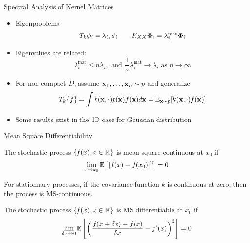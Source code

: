 \documentclass{beamer}
\begin{document}
\begin{frame}{Spectral Analysis of Kernel Matrices}
\begin{itemize}
    \item Eigenproblems
    \begin{equation*}
        T_k \phi_i = \lambda_i, \phi_i \qquad K_{XX} \boldsymbol{\mathbf{\Phi}}_i = \lambda_i^\text{mat} \boldsymbol{\mathbf{\Phi}}_i
    \end{equation*}
    \item Eigenvalues are related: 
    \begin{equation*}
        \lambda_i^\text{mat} \le n \lambda_i,  \text{ and }  \frac 1 n \lambda_i^\text{mat} \rightarrow \lambda_i \text{ as } n\to\infty
    \end{equation*}
    \item For non-compact $D$, assume $\boldsymbol{\mathbf{x}}_1, \ldots, \boldsymbol{\mathbf{x}}_n \sim p$ and generalize
    \begin{equation*}
        T_k\{f\} = \int k(\boldsymbol{\mathbf{x}}, \cdot ) p(\boldsymbol{\mathbf{x}}) f(\boldsymbol{\mathbf{x}}) d\boldsymbol{\mathbf{x}} = \operatorname{\mathbb{E}}_{\boldsymbol{\mathbf{x}} \sim p}[k(\boldsymbol{\mathbf{x}}, \cdot) f(\boldsymbol{\mathbf{x}})]
    \end{equation*}
    \item Some results exist in the 1D case for Gaussian distribution
\end{itemize}
\end{frame}

\begin{frame}{Mean Square Differentiability}
\begin{definition}
The stochastic process $\{f(x), x\in \mathbb R\}$ is mean-square continuous at $x_0$ if 
\begin{equation*}
    \lim_{x \to x_0} \operatorname{\mathbb{E}}\left[ |f(x) - f(x_0)|^2 \right] = 0
\end{equation*}
\end{definition}
\begin{proposition}
For stationnary processes, if the covariance function $k$ is continuous at zero, then the process is MS-continuous.
\end{proposition}
\begin{definition}
The stochastic process $\{f(x), x\in \mathbb R\}$ is MS differentiable at $x_0$ if \begin{equation*}
    \lim_{\delta x \to 0} \operatorname{\mathbb{E}} \left[ \left( \frac{f(x+\delta x) - f(x)}{\delta x} - f'(x) \right)^2 \right] = 0
\end{equation*}
\end{definition}
\end{frame}
\end{document}
